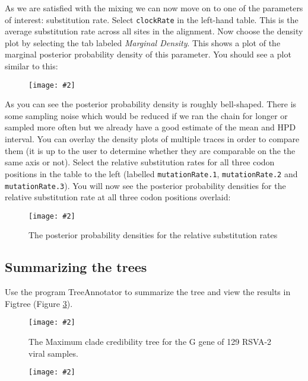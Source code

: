 \documentclass[12pt]{article}
\newcommand{\includeimage}[2][]{%
\texttt{[image: \#2]}
}
\begin{document}
As we are satisfied with the mixing we can now move on to one of the parameters of interest:
substitution rate. Select \texttt{clockRate} in the left-hand table. This is the average substitution rate across all sites in the
alignment. Now choose the density plot by selecting the tab labeled {\it Marginal Density}. This shows a plot of the marginal posterior probability
density of this parameter. You should see a plot similar to this:

\begin{figure}
\centering	
\includeimage[width=0.8\textwidth]{figures/Tracer_density}
\label{fig:Tracer_density}
\end{figure}

As you can see the posterior probability density is roughly bell-shaped. There is some sampling noise which would be
reduced if we ran the chain for longer or sampled more often but we already have a good estimate of the mean and HPD interval. You can overlay
the density plots of multiple traces in order to compare them (it is up to the user to determine whether they are comparable on the the same axis or not). Select the relative substitution rates for all three codon positions in the table to the left (labelled
\texttt{mutationRate.1}, \texttt{mutationRate.2} and \texttt{mutationRate.3}). You will now see the posterior probability densities for the relative
substitution rate at all three codon positions overlaid:

\begin{figure}
\centering	
\includeimage[width=0.8\textwidth]{figures/Tracer_relativeRates}
\label{fig:Tracer_relativeRates}
\caption{The posterior probability densities for the relative substitution rates}
\end{figure}

\subsection*{Summarizing the trees}

Use the program TreeAnnotator to summarize the tree and view the results in Figtree (Figure \ref{fig:RSV2tree}).

\begin{figure}
\centering	
\includeimage[width=\textwidth]{figures/RSV2_mcc_tree}
\caption{The Maximum clade credibility tree for the G gene of 129 RSVA-2 viral samples. }
\label{fig:RSV2tree}
\end{figure}

\begin{figure}
\centering	
\includeimage[width=\textwidth]{figures/DensiTree}
\label{fig:DensiTree}
\end{figure}
\end{document}
